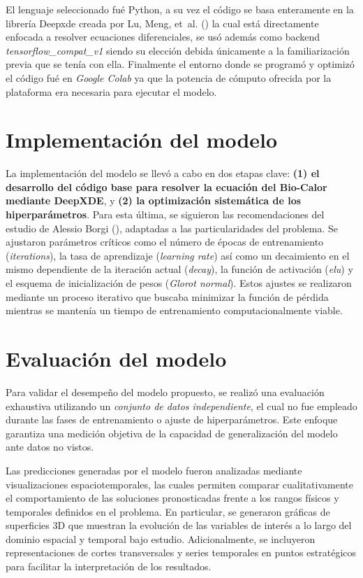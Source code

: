 \documentclass[
  spanish,
  us-letterpaper,
]{scrreprt}
\theoremstyle{plain}
\theoremstyle{definition}
\theoremstyle{remark}
\begin{document}
El lenguaje seleccionado fué Python, a su vez el código se basa
enteramente en la librería Deepxde creada por Lu, Meng, et~al.
() la cual está directamente enfocada a
resolver ecuaciones diferenciales, se usó además como backend
\emph{tensorflow\_compat\_v1} siendo su elección debida únicamente a la
familiarización previa que se tenía con ella. Finalmente el entorno
donde se programó y optimizó el código fué en \emph{Google Colab} ya que
la potencia de cómputo ofrecida por la plataforma era necesaria para
ejecutar el modelo.

\section{Implementación del modelo}\label{implementaciuxf3n-del-modelo}

La implementación del modelo se llevó a cabo en dos etapas clave:
\textbf{(1) el desarrollo del código base para resolver la ecuación del
Bio-Calor mediante DeepXDE}, y \textbf{(2) la optimización sistemática
de los hiperparámetros}. Para esta última, se siguieron las
recomendaciones del estudio de Alessio Borgi
(), adaptadas a las particularidades del
problema. Se ajustaron parámetros críticos como el número de épocas de
entrenamiento (\emph{iterations}), la tasa de aprendizaje
(\emph{learning rate}) así como un decaimiento en el mismo dependiente
de la iteración actual (\emph{decay}), la función de activación
(\emph{elu}) y el esquema de inicialización de pesos (\emph{Glorot
normal}). Estos ajustes se realizaron mediante un proceso iterativo que
buscaba minimizar la función de pérdida mientras se mantenía un tiempo
de entrenamiento computacionalmente viable.

\section{Evaluación del modelo}\label{evaluaciuxf3n-del-modelo}

Para validar el desempeño del modelo propuesto, se realizó una
evaluación exhaustiva utilizando un \emph{conjunto de datos
independiente}, el cual no fue empleado durante las fases de
entrenamiento o ajuste de hiperparámetros. Este enfoque garantiza una
medición objetiva de la capacidad de generalización del modelo ante
datos no vistos.

Las predicciones generadas por el modelo fueron analizadas mediante
visualizaciones espaciotemporales, las cuales permiten comparar
cualitativamente el comportamiento de las soluciones pronosticadas
frente a los rangos físicos y temporales definidos en el problema. En
particular, se generaron gráficas de superficies 3D que muestran la
evolución de las variables de interés a lo largo del dominio espacial y
temporal bajo estudio. Adicionalmente, se incluyeron representaciones de
cortes transversales y series temporales en puntos estratégicos para
facilitar la interpretación de los resultados.
\end{document}
